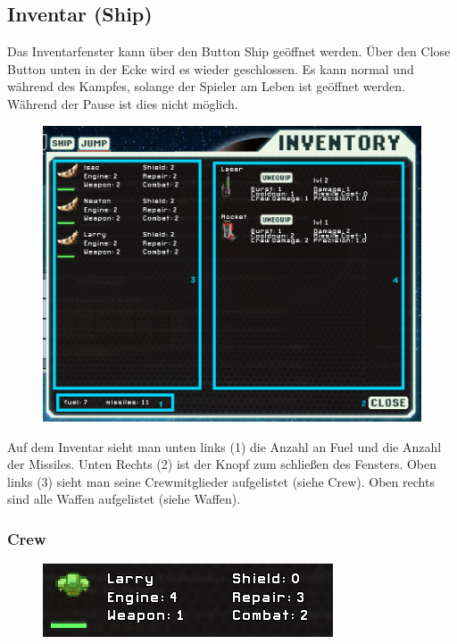 \documentclass[fontsize=12pt,paper=a4,twoside]{scrartcl}
\begin{document}
\subsection{Inventar (Ship)}

Das Inventarfenster kann über den Button Ship geöffnet werden. Über den Close Button unten in der Ecke wird es wieder geschlossen. Es kann normal und während des Kampfes, solange der Spieler am Leben ist geöffnet werden. Während der Pause ist dies nicht möglich. 

\begin{figure}[H]
\centering
\includegraphics[width=0.8\linewidth]{DasSpiel/Inventar/inventar.png}
\end{figure} 

Auf dem Inventar sieht man unten links (1) die Anzahl an Fuel und die Anzahl der Missiles. Unten Rechts (2) ist der Knopf zum schließen des Fensters. Oben links (3) sieht man seine Crewmitglieder aufgelistet (siehe Crew). Oben rechts sind alle Waffen aufgelistet (siehe Waffen). 

\subsubsection{Crew}

\begin{figure}[H]
\centering
\includegraphics[width=0.8\linewidth]{DasSpiel/Inventar/crew.png}
\end{figure} 
\end{document}
